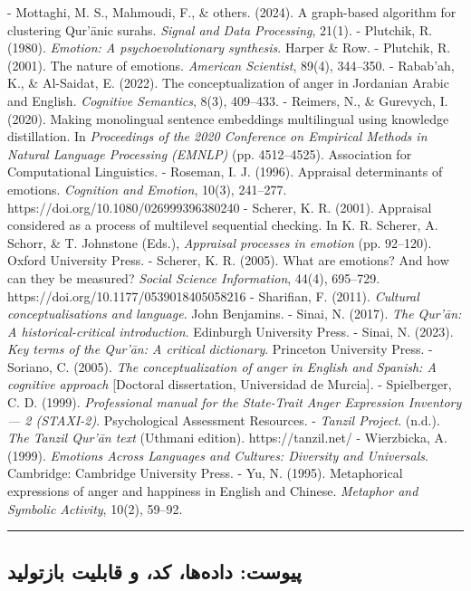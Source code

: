 \documentclass[12pt,a4paper]{article}
\begin{document}
\begin{RTL}
\begin{otherlanguage}{persian}
\begin{LTR}
- Mottaghi, M. S., Mahmoudi, F., \& others. (2024). A graph-based algorithm for clustering Qur’ānic surahs. \emph{Signal and Data Processing}, 21(1).
- Plutchik, R. (1980). \emph{Emotion: A psychoevolutionary synthesis}. Harper \& Row.
- Plutchik, R. (2001). The nature of emotions. \emph{American Scientist}, 89(4), 344–350.
- Rabab’ah, K., \& Al-Saidat, E. (2022). The conceptualization of anger in Jordanian Arabic and English. \emph{Cognitive Semantics}, 8(3), 409–433.
- Reimers, N., \& Gurevych, I. (2020). Making monolingual sentence embeddings multilingual using knowledge distillation. In \emph{Proceedings of the 2020 Conference on Empirical Methods in Natural Language Processing (EMNLP)} (pp. 4512–4525). Association for Computational Linguistics.
- Roseman, I. J. (1996). Appraisal determinants of emotions. \emph{Cognition and Emotion}, 10(3), 241–277. https://doi.org/10.1080/026999396380240
- Scherer, K. R. (2001). Appraisal considered as a process of multilevel sequential checking. In K. R. Scherer, A. Schorr, \& T. Johnstone (Eds.), \emph{Appraisal processes in emotion} (pp. 92–120). Oxford University Press.
- Scherer, K. R. (2005). What are emotions? And how can they be measured? \emph{Social Science Information}, 44(4), 695–729. https://doi.org/10.1177/0539018405058216
- Sharifian, F. (2011). \emph{Cultural conceptualisations and language}. John Benjamins.
- Sinai, N. (2017). \emph{The Qur’ān: A historical-critical introduction}. Edinburgh University Press.
- Sinai, N. (2023). \emph{Key terms of the Qur’ān: A critical dictionary}. Princeton University Press.
- Soriano, C. (2005). \emph{The conceptualization of anger in English and Spanish: A cognitive approach} [Doctoral dissertation, Universidad de Murcia].
- Spielberger, C. D. (1999). \emph{Professional manual for the State-Trait Anger Expression Inventory — 2 (STAXI-2)}. Psychological Assessment Resources.
- \emph{Tanzil Project}. (n.d.). \emph{The Tanzil Qur’ān text} (Uthmani edition). https://tanzil.net/
- Wierzbicka, A. (1999). \emph{Emotions Across Languages and Cultures: Diversity and Universals}. Cambridge: Cambridge University Press.
- Yu, N. (1995). Metaphorical expressions of anger and happiness in English and Chinese. \emph{Metaphor and Symbolic Activity}, 10(2), 59–92.

\end{LTR}

\begin{center}\rule{0.5\linewidth}{0.5pt}\end{center}

\subsection{پیوست: داده‌ها، کد، و قابلیت
بازتولید}\label{ux67eux6ccux648ux633ux62a-ux62fux627ux62fux647ux647ux627-ux6a9ux62f-ux648-ux642ux627ux628ux644ux6ccux62a-ux628ux627ux632ux62aux648ux644ux6ccux62f}


\end{otherlanguage}
\end{RTL}
\end{document}
